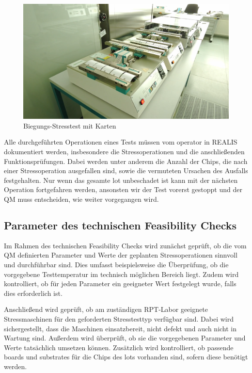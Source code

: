 \begin{figure}[!htbp]
    \centering
    \includegraphics[width=1\textwidth]{bilder/stresstest-card1.png}
    \caption{Biegungs-Stresstest mit Karten \cite{RPTLaborIntern}}
    \label{fig:stresstest-card}
\end{figure}

Alle durchgeführten Operationen eines Tests müssen vom \gls{operator} in \gls{REALIS} dokumentiert werden, insbesondere die Stressoperationen und die anschließenden Funktionsprüfungen. Dabei werden unter anderem die Anzahl der Chips, die nach einer Stressoperation ausgefallen sind, sowie die vermuteten Ursachen des Ausfalls festgehalten.
Nur wenn das gesamte \gls{lot} unbeschadet ist kann mit der nächsten Operation fortgefahren werden, ansonsten wir der Test vorerst gestoppt und der \gls{QM} muss entscheiden, wie weiter vorgegangen wird.

\subsection{Parameter des technischen Feasibility Checks}\label{Subsec:ParameterdestechnischenFeasibilityChecks}

Im Rahmen des technischen Feasibility Checks wird zunächst geprüft, ob die vom \gls{QM} definierten Parameter und Werte der geplanten Stressoperationen sinnvoll und durchführbar sind. Dies umfasst beispielsweise die Überprüfung, ob die vorgegebene Testtemperatur im technisch möglichen Bereich liegt. Zudem wird kontrolliert, ob für jeden Parameter ein geeigneter Wert festgelegt wurde, falls dies erforderlich ist.

Anschließend wird geprüft, ob am zuständigen \gls{RPT}-Labor geeignete Stressmaschinen für den geforderten Stresstesttyp verfügbar sind. Dabei wird sichergestellt, dass die Maschinen einsatzbereit, nicht defekt und auch nicht in Wartung sind. Außerdem wird überprüft, ob sie die vorgegebenen Parameter und Werte tatsächlich umsetzen können. Zusätzlich wird kontrolliert, ob passende \glspl{board} und \glspl{substrate} für die Chips des \glspl{lot} vorhanden sind, sofern diese benötigt werden.


